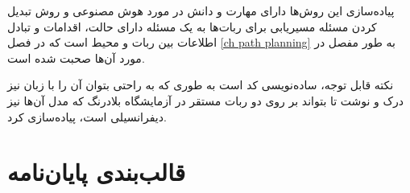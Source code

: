 پیاده‌سازی این روش‌ها دارای مهارت و دانش در مورد هوش مصنوعی و روش تبدیل کردن مسئله مسیریابی برای ربات‌ها به یک مسئله دارای حالت، اقدامات و تبادل اطلاعات بین ربات‌ و محیط است که در فصل \ref{ch path planning} به طور مفصل در مورد آن‌ها صحبت شده است.

نکته قابل توجه، ساده‌نویسی کد است به طوری که به راحتی بتوان آن را با زبان  نیز درک و نوشت تا بتواند بر روی دو ربات مستقر در آزمایشگاه بلادرنگ که مدل آن‌ها نیز دیفرانسیلی است، پیاده‌سازی کرد.

\section{قالب‌بندی پایان‌نامه}






















